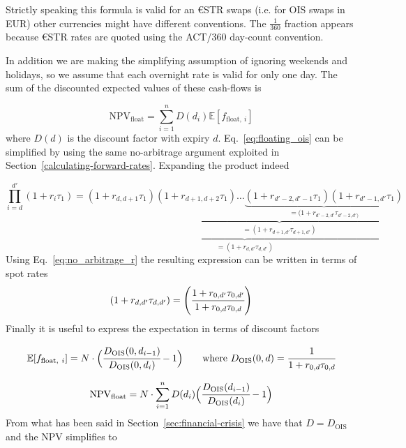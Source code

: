 Strictly speaking this formula is valid for an \euro STR swaps (i.e. for OIS swaps in EUR) other currencies might have different conventions.
The $\frac{1}{360}$ fraction appears because \euro STR rates are quoted using the ACT/360 day-count convention.

In addition we are making the simplifying assumption of ignoring weekends and holidays, so we assume that each overnight rate is valid for only one day.
The sum of the discounted expected values of these cash-flows is

\begin{equation}
\mathrm{NPV}_{\mathrm{float}} = \sum_{i=1}^{n}D(d_i)\mathbb{E}[f_{\mathrm{float},~i}]
\end{equation}
where $D(d)$ is the discount factor with expiry $d$. Eq.~\ref{eq:floating_ois} can be simplified by using the same no-arbitrage argument exploited in
Section~\ref{calculating-forward-rates}. Expanding the product indeed

\begin{equation*}
\prod_{i=d}^{d'} (1+r_i\tau_1) = \underbrace{(1+r_{d,d+1}\tau_1)\underbrace{(1+r_{d+1,d+2}\tau_1)\ldots\underbrace{(1+r_{d'-2,d'-1}\tau_1)(1+r_{d'-1,d'}\tau_1)}_{\textstyle =(1+r_{d'-2,d'}\tau_{d'-2,d')}}}_{\textstyle =(1+r_{d+1,d'}\tau_{d+1, d'})}}_{\textstyle =(1+r_{d,d'}\tau_{d,d'})}
\end{equation*}
\noindent
Using Eq.~\ref{eq:no_arbitrage_r} the resulting expression can be written in terms of spot rates
\begin{equation*}
(1+r_{d,d'}\tau_{d,d'}) = \left(\cfrac{1+r_{0, d'}\tau_{0,d'}}{1+r_{0,d}\tau_{0,d}}\right)
\end{equation*}
\noindent 
Finally it is useful to express the expectation in terms of discount factors

\begin{equation*}
\mathbb{E}[f_{\mathrm{float},~i}] = N\cdot\Big(\cfrac{D_{\mathrm{OIS}}(0, d_{i-1})}{D_{\mathrm{OIS}}(0, d_{i})} - 1\Big)\qquad \mathrm{where}\ D_{\mathrm{OIS}}(0,d)=\cfrac{1}{1+r_{0,d}\tau_{0,d}}
\end{equation*}

\begin{equation*}
\mathrm{NPV}_{\mathrm{float}} = N\cdot \sum_{i=1}^{n}D(d_i) \Big(\cfrac{D_{\mathrm{OIS}}(d_{i-1})}{D_{\mathrm{OIS}}(d_{i})} - 1\Big)
\end{equation*}
From what has been said in Section~\ref{sec:financial-crisis} we have that $D = D_{\mathrm{OIS}}$ and the NPV simplifies to

